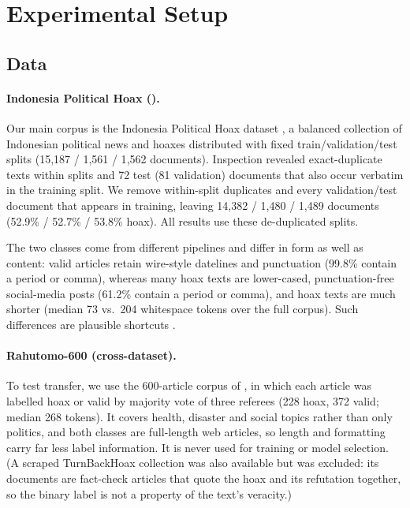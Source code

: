 \section{Experimental Setup}
\label{sec:setup}

\subsection{Data}

\paragraph{Indonesia Political Hoax (\iph{}).}
Our main corpus is the Indonesia Political Hoax dataset
, a balanced collection of Indonesian political news and hoaxes distributed with fixed
train/validation/test splits (15{,}187 / 1{,}561 / 1{,}562 documents). Inspection revealed
exact-duplicate texts within splits and 72 test (81 validation) documents that also occur verbatim in
the training split. We remove within-split duplicates and every validation/test document that appears in
training, leaving 14{,}382 / 1{,}480 / 1{,}489 documents (52.9\% / 52.7\% / 53.8\% hoax). All results use
these de-duplicated splits.

The two classes come from different pipelines and differ in form as well as content: valid articles
retain wire-style datelines and punctuation (99.8\% contain a period or comma), whereas many hoax
texts are lower-cased, punctuation-free social-media posts (61.2\% contain a period or comma), and hoax
texts are much shorter (median 73 vs.\ 204 whitespace tokens over the full corpus). Such differences
are plausible shortcuts \citep{geirhos2020shortcut}.

\paragraph{Rahutomo-600 (cross-dataset).}
To test transfer, we use the 600-article corpus of \citet{pratiwi2017hoax}, in which each article was
labelled hoax or valid by majority vote of three referees (228 hoax, 372 valid; median 268 tokens). It
covers health, disaster and social topics rather than only politics, and both classes are full-length
web articles, so length and formatting carry far less label information. It is never used for training
or model selection. (A scraped TurnBackHoax collection was also available but was excluded: its documents
are fact-check articles that quote the hoax and its refutation together, so the binary label is not a
property of the text's veracity.)

